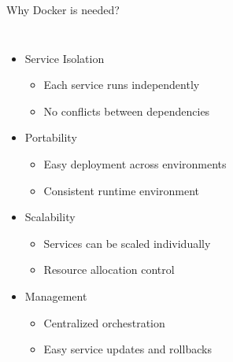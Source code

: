 \documentclass[aspectratio=169]{beamer}
\begin{document}
\begin{frame}{Why Docker is needed?}
\begin{columns}
\begin{itemize}
    \item Service Isolation
    \begin{itemize}
        \item Each service runs independently
        \item No conflicts between dependencies
    \end{itemize}
    \item Portability
    \begin{itemize}
        \item Easy deployment across environments
        \item Consistent runtime environment
    \end{itemize}
    \item Scalability
    \begin{itemize}
        \item Services can be scaled individually
        \item Resource allocation control
    \end{itemize}
    \item Management
    \begin{itemize}
        \item Centralized orchestration
        \item Easy service updates and rollbacks
    \end{itemize}
\end{itemize}

\begin{center}
\end{center}
\end{columns}
\end{frame}
\end{document}
